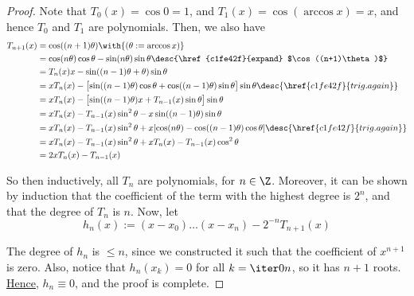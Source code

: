 \begin{proof}
  Note that $T_0(x)=\cos0=1$, and $T_1(x)=\cos(\arccos x)=x$, and hence $T_0$
  and $T_1$ are polynomials. Then, we also have
  \begin{align*}
    T_{n+1}(x) &=\cos((n+1)\theta)\with{(\theta:=\arccos x)}                                                                             \\
               &=\cos(n\theta)\cos\theta-\sin(n\theta)\sin\theta\desc{\href{c1fe42f}{expand} $\cos((n+1)\theta)$}                        \\
               &=T_n(x)x-\sin((n-1)\theta+\theta)\sin\theta                                                                              \\
               &=xT_n(x)-\bigl[\sin((n-1)\theta)\cos\theta+\cos((n-1)\theta)\sin\theta\bigr]\sin\theta\desc{\href{c1fe42f}{trig. again}} \\
               &=xT_n(x)-\bigl[\sin((n-1)\theta)x+T_{n-1}(x)\sin\theta\bigr]\sin\theta                                                   \\
               &=xT_n(x)-T_{n-1}(x)\sin^2\theta-x\sin((n-1)\theta)\sin\theta                                                             \\
               &=xT_n(x)-T_{n-1}(x)\sin^2\theta+x[\cos(n\theta)-\cos((n-1)\theta)\cos\theta]\desc{\href{c1fe42f}{trig. again}}           \\
               &=xT_n(x)-T_{n-1}(x)\sin^2\theta+xT_n(x)-T_{n-1}(x)\cos^2\theta                                                           \\
               &=2xT_n(x)-T_{n-1}(x)
  \end{align*}

  So then inductively, all $T_n$ are polynomials, for $n\in\Z$. Moreover, it
  can be shown by induction that the coefficient of the term with the highest
  degree is $2^n$, and that the degree of $T_n$ is $n$. Now, let
  $$
    h_n(x):=(x-x_0)\ldots(x-x_n)-2^{-n}T_{n+1}(x)
  $$

  The degree of $h_n$ is $\leq n$, since we constructed it such that the
  coefficient of $x^{n+1}$ is zero. Also, notice that $h_n(x_k)=0$ for all
  $k=\iter0n$, so it has $n+1$ roots. \href{ea3fbed}{Hence}, $h_n\equiv0$, and
  the proof is complete.
\end{proof}
